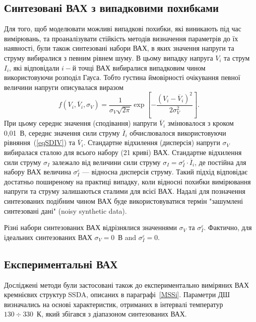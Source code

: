 \subsection{Синтезовані ВАХ з випадковими похибками}
Для того, щоб моделювати можливі випадкові похибки, які виникають під час вимірювань, та проаналізувати стійкість методів визначення параметрів до їх наявності,
були також синтезовані набори ВАХ, в яких значення напруги та струму вибиралися з певним рівнем шуму.
В цьому випадку напруга $V_i$ та струм $I_i$, які відповідали $i-$й точці ВАХ вибиралися випадковим чином використовуючи розподіл Гауса.
Тобто густина ймовірності очікування певної величини напруги описувалася виразом
\begin{equation}
\label{eqGaus}
f(V_i,\overline{V}_i,\sigma_V)=\frac{1}{\sigma_V\sqrt{2\pi}}\exp\left[-\frac{(V_i-\overline{V}_i)^2}{2\sigma_V^2}\right].
\end{equation}
При цьому середнє значення (сподівання) напруги $\overline{V}_i$ змінювалося з кроком 0,01~В,
середнє значення сили струму $\overline{I}_i$ обчислювалося використовуючи рівняння~(\ref{eqSDIV}) та $\overline{V}_i$.
Стандартне відхилення (дисперсія) напруги $\sigma_V$ вибиралася сталою для всього набору (21 криві) ВАХ.
Стандартне відхилення сили струму $\sigma_I$ залежало від величини сили струму $\sigma_I=\sigma_I^\varepsilon\cdot\overline{I}_i$,
де постійна для набору ВАХ величина $\sigma_I^\varepsilon$ --- відносна дисперсія струму.
Такий підхід відповідає достатньо поширеному на практиці випадку, коли відносні похибки вимірювання напруги та струму залишаються сталими для всієї ВАХ.
Надалі для позначення синтезованих подібним чином ВАХ буде використовуватися термін "зашумлені синтезовані дані" (noisy synthetic data).

Різні набори синтезованих ВАХ відрізнялися значеннями $\sigma_V$ та $\sigma_I^\varepsilon$.
Фактично, для ідеальних синтезованих ВАХ $\sigma_V=0$~В and $\sigma_I^\varepsilon=0$.


\subsection{Експериментальні ВАХ}
Досліджені методи були застосовані також до експериментально виміряних ВАХ кремнієвих структур SSDA, описаних в параграфі~\ref{MSSi}.
Параметри ДШ визначались на основі характеристик, отриманих в інтервалі температур $130\div330$~К, який збігався з діапазоном синтезованих ВАХ.

